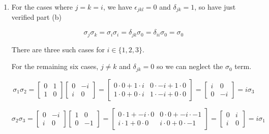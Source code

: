 \documentclass[12pt]{article}
\begin{document}
\begin{enumerate}
\item
For the cases where $j=k=i$, we have $\epsilon_{jkl}=0$ and $\delta_{jk}=1$,
so have just verified part (b)

\begin{equation}
\sigma_j\sigma_k = \sigma_i \sigma_i = \delta_{jk}\sigma_0 = \delta_{ii}\sigma_0 = \sigma_0
\end{equation}

There are three such cases for $i \in \{1,2,3\}$.

For the remaining six cases, $j \ne k$ and $\delta_{jk} = 0$ so we can neglect
the $\sigma_0$ term.

\begin{equation}
\sigma_1 \sigma_2 =
\begin{bmatrix}
0 & 1\\
1 & 0
\end{bmatrix}
\begin{bmatrix}
0 & -i\\
i & 0
\end{bmatrix}
=
\begin{bmatrix}
0\cdot 0 + 1\cdot i & 0\cdot -i + 1\cdot 0\\
1\cdot 0 + 0 \cdot i & 1\cdot -i + 0\cdot 0
\end{bmatrix}
=
\begin{bmatrix}
i & 0\\
0 & -i
\end{bmatrix}
= i \sigma_3
\end{equation}

\begin{equation}
\sigma_2 \sigma_3 =
\begin{bmatrix}
0 & -i\\
i & 0
\end{bmatrix}
\begin{bmatrix}
1 & 0\\
0 & -1
\end{bmatrix}
=
\begin{bmatrix}
0\cdot 1 + -i\cdot 0 & 0\cdot 0 + -i\cdot -1\\
i\cdot 1 + 0 \cdot 0 & i\cdot 0 + 0\cdot -1
\end{bmatrix}
=
\begin{bmatrix}
0 & i\\
i & 0
\end{bmatrix}
= i \sigma_1
\end{equation}


\end{enumerate}
\end{document}
